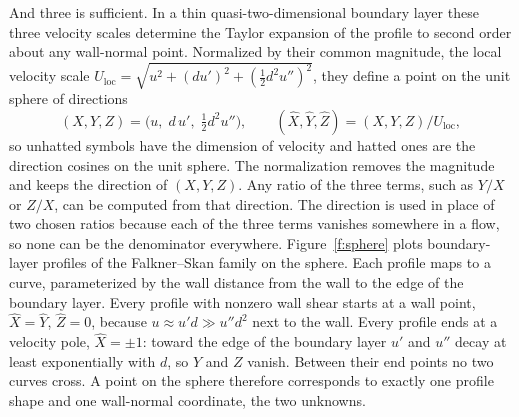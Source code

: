 \documentclass[conf]{new-aiaa}
\begin{document}
And three is sufficient. In a thin quasi-two-dimensional boundary layer these three
velocity scales determine the Taylor expansion of the profile to second order
about any wall-normal point. Normalized by their
common magnitude, the local velocity scale
$U_\mathrm{loc}=\sqrt{u^2+(du')^2+(\tfrac12 d^2u'')^2}$, they define a point on the unit sphere of directions
\begin{equation}
  (X,Y,Z) = \big(u,\;d\,u',\;\tfrac12 d^2u''\big),
  \qquad
  (\hat X,\hat Y,\hat Z) = (X,Y,Z)\big/U_\mathrm{loc},
  \label{w:ind}
\end{equation}
so unhatted symbols have the dimension of velocity and hatted ones are the
direction cosines on the unit sphere. The normalization removes the
magnitude and keeps the direction of $(X,Y,Z)$. Any ratio of the three terms,
such as $Y/X$ or $Z/X$, can be computed from that direction. The direction is
used in place of two chosen ratios because each of the three terms vanishes
somewhere in a flow, so none can be the denominator everywhere.
Figure~\ref{f:sphere} plots boundary-layer profiles of the Falkner--Skan family
\cite{falkner_skan_1931} on the sphere. Each profile maps to
a curve, parameterized by the wall distance from the wall to the edge of the boundary layer. Every profile with nonzero wall shear starts at a wall point,
$\hat X=\hat Y$, $\hat Z=0$, because $u\approx u'd\gg u''d^2$ next to the
wall. Every profile ends at a velocity pole, $\hat X=\pm1$: toward the edge of the boundary layer $u'$ and $u''$ decay at least
exponentially with $d$, so $Y$ and $Z$ vanish.
Between their end points no two curves cross. A point on the sphere therefore
corresponds to exactly one profile shape and one wall-normal coordinate, the two unknowns.
\end{document}
